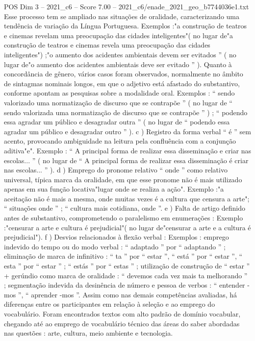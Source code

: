 \begin{textsample}{POS Dim 3 – 2021\_c6 – Score 7.00 – 2021\_c6/enade\_2021\_geo\_b7744036e1.txt}
Esse processo tem se ampliado nas situações de oralidade, caracterizando uma tendência de variação da Língua Portuguesa.
Exemplos :"a construção de teatros e cinemas revelam uma preocupação das cidades inteligentes"( no lugar de"a construção de teatros e cinemas revela uma preocupação das cidades inteligentes") ;"o aumento dos acidentes ambientais devem ser evitados ” ( no lugar de"o aumento dos acidentes ambientais deve ser evitado ” ).
Quanto à concordância de gênero, vários casos foram observados, normalmente no âmbito de sintagmas nominais longos, em que o adjetivo está afastado do substantivo, conforme apontam as pesquisas sobre a modalidade oral.
Exemplos : “ sendo valorizado uma normatização de discurso que se contrapõe ” ( no lugar de “ sendo valorizada uma normatização de discurso que se contrapõe ” ) ; “ podendo essa agradar um público e desagradar outra ” ( no lugar de “ podendo essa agradar um público e desagradar outro ” ). c ) Registro da forma verbal “ é ” sem acento, provocando ambiguidade na leitura pela confluência com a conjunção aditiva"e".
Exemplo : “ A principal forma de realizar essa disseminação e criar nas escolas... ” ( no lugar de “ A principal forma de realizar essa disseminação é criar nas escolas... ” ). d ) Emprego do pronome relativo “ onde ” como relativo universal, típica marca da oralidade, em que esse pronome não é mais utilizado apenas em sua função locativa"lugar onde se realiza a ação".
Exemplo :"a aceitação não é mais a mesma, onde muitas vezes é a cultura que censura a arte"; “ situações onde ” ; “ cultura mais cotidiana, onde ”. e ) Falta de artigo definido antes de substantivo, comprometendo o paralelismo em enumerações : Exemplo :"censurar a arte e cultura é prejudicial"( no lugar de"censurar a arte e a cultura é prejudicial"). f ) Desvios relacionados à flexão verbal : Exemplos : emprego indevido do tempo ou do modo verbal : “ adaptado ” por “ adaptando ” ; eliminação de marca de infinitivo : “ ta ” por “ estar ”, “ está ” por “ estar ”, “ esta ” por “ estar ” ; “ estás ” por “ estas ” ; utilização de construção de “ estar ” + gerúndio como marca de oralidade : “ devemos cada vez mais ta melhorando ” ; segmentação indevida da desinência de número e pessoa de verbos : “ entender -mos ”, “ aprender -mos ”.
Assim como nas demais competências avaliadas, há diferenças entre os participantes em relação à seleção e ao emprego do vocabulário.
Foram encontrados textos com alto padrão de domínio vocabular, chegando até ao emprego de vocabulário técnico das áreas do saber abordadas nas questões : arte, cultura, meio ambiente e tecnologia.

\end{textsample}
